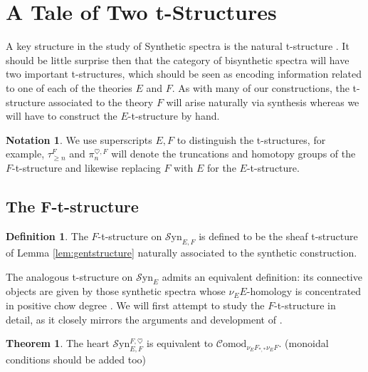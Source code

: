 \documentclass[10pt]{amsart}
\theoremstyle{definition}
\numberwithin{figure}{section}
\numberwithin{equation}{section}
\newtheorem{theorem}[figure]{Theorem}
\newtheorem{definition}[figure]{Definition}
\newtheorem{notation}[figure]{Notation}
\theoremstyle{cited}
\newcommand{\Syn}{\mathcal{S}\mathrm{yn}}
\newcommand{\Comod}{\mathcal{C}\mathrm{omod}}
\begin{document}
\section{A Tale of Two t-Structures}

A key structure in the study of Synthetic spectra is the natural t-structure \cite[Sec. 4.2]{Pst22}. It should be little surprise then that the category of bisynthetic spectra will have two important t-structures, which should be seen as encoding information related to one of each of the theories $E$ and $F$. As with many of our constructions, the t-structure associated to the theory $F$ will arise naturally via synthesis whereas we will have to construct the $E$-t-structure by hand.

\begin{notation}
  We use superscripts $E,F$ to distinguish the t-structures, for example, $\tau_{\geq n}^F$ and $\pi_n^{\heartsuit,F}$ will denote the truncations and homotopy groups of the $F$-t-structure and likewise replacing $F$ with $E$ for the $E$-t-structure.
\end{notation}

\subsection{The F-t-structure}

\begin{definition}
  The $F$-t-structure on $\Syn_{E,F}$ is defined to be the sheaf t-structure of Lemma \ref{lem:gentstructure} naturally associated to the synthetic construction.
\end{definition}

The analogous t-structure on $\Syn_E$ admits an equivalent definition: its connective objects are given by those synthetic spectra whose $\nu_EE$-homology is concentrated in positive chow degree \cite[Cor. 4.19]{Pst22}. We will first attempt to study the $F$-t-structure in detail, as it closely mirrors the arguments and development of \cite{Pst22}.

\begin{theorem}
      The heart $\Syn_{E,F}^{F,\heartsuit}$ is equivalent to $\Comod_{\nu_EF_{*,*}\nu_EF}$. (monoidal conditions should be added too)
\end{theorem}
  
\end{document}
